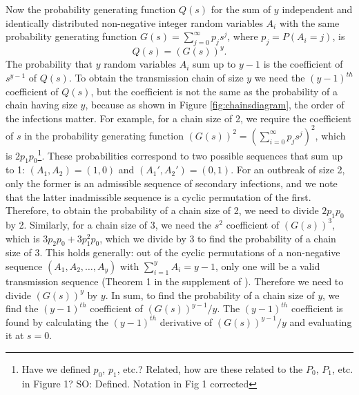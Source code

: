 \documentclass{imammb}
\numberwithin{equation}{section}
\begin{document}
Now the probability generating function $Q(s)$ for the sum of $y$ independent and identically distributed non-negative integer random variables $A_i$ with the same probability generating function $G(s) = \sum_{j=0}^\infty p_j s^j$, where $p_j = P(A_i = j)$, is 
$$Q(s) = (G(s))^y.$$
The probability that $y$ random variables $A_i$ sum up to $y-1$ is the coefficient of $s^{y-1}$ of $Q(s)$. To obtain the transmission chain of size $y$ we need the $(y-1)^{th}$ coefficient of $Q(s)$, but the coefficient is not the same as the probability of a chain having size $y$, because as shown in Figure \ref{fig:chainsdiagram}, the order of the infections matter. For example, for a chain size of 2, we require the coefficient of $s$ in the probability generating function $(G(s))^2 = (\sum_{i=0}^\infty p_j s^j)^2$, which is $2 p_1 p_0$\footnote{Have we defined $p_0$, $p_1$, etc.? Related, how are these related to the $P_0$, $P_1$, etc. in Figure 1? SO: Defined. Notation in Fig 1 corrected}. These probabilities correspond to two possible sequences that sum up to 1: $(A_1 ,A_2) = (1, 0)$ and $(A_1', A_2') = (0 ,1)$. For an outbreak of size 2, only the former is an admissible sequence of secondary infections, and we note that the latter inadmissible sequence is a cyclic permutation of the first. Therefore, to obtain the probability of a chain size of 2, we need to divide $2 p_1 p_0$ by 2. Similarly, for a chain size of 3, we need the $s^2$ coefficient  of $(G(s))^3$, which is $3p_2 p_0 + 3 p_1^2 p_0$, which we divide by 3 to find the probability of a chain size of 3.  This holds generally: out of the cyclic permutations of a non-negative sequence $(A_1, A_2,\dots,A_y)$ with $\sum_{i=1}^y A_i = y-1$, only one will be a valid transmission sequence (Theorem 1 in the supplement of \citet{Blumberg2013-xv}). Therefore we need to divide $(G(s))^y$ by $y$. In sum, to find the probability of a chain size of $y$, we find the $(y-1)^{th}$ coefficient of $(G(s))^{y-1}/y $. The $(y-1)^{th}$ coefficient is found by calculating the $(y-1)^{th}$ derivative  of $(G(s))^{y-1}/y $  and evaluating it at $s=0$. 
\end{document}
